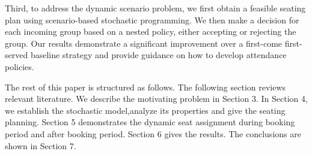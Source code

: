 Third, to address the dynamic scenario problem, we first obtain a feasible seating plan using scenario-based stochastic programming. We then make a decision for each incoming group based on a nested policy, either accepting or rejecting the group. Our results demonstrate a significant improvement over a first-come first-served baseline strategy and provide guidance on how to develop attendance policies.





The rest of this paper is structured as follows. The following section reviews relevant literature. We describe the motivating problem in Section 3. In Section 4, we establish the stochastic model,analyze its properties and give the seating planning. Section 5 demonstrates the dynamic seat assignment during booking period and after booking period. Section 6 gives the results. The conclusions are shown in Section 7.

\newpage
